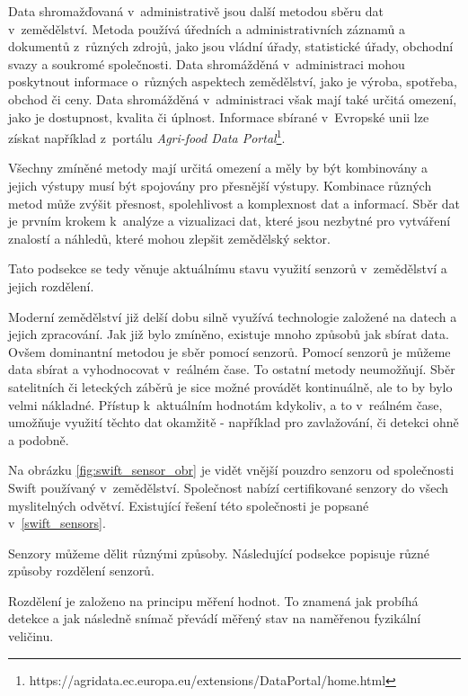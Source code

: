 Data shromažďovaná v~administrativě jsou další metodou sběru dat v~zemědělství. Metoda používá úředních a administrativních záznamů a dokumentů z~různých zdrojů, jako jsou vládní úřady, statistické úřady, obchodní svazy a soukromé společnosti. Data shromážděná v~administraci mohou poskytnout informace o~různých aspektech zemědělství, jako je výroba, spotřeba, obchod či ceny. Data shromážděná v~administraci však mají také určitá omezení, jako je dostupnost, kvalita či úplnost. Informace sbírané v~Evropské unii lze získat například z~portálu \textit{Agri-food Data Portal}\footnote{https://agridata.ec.europa.eu/extensions/DataPortal/home.html}.

Všechny zmíněné metody mají určitá omezení a měly by být kombinovány a jejich výstupy musí být spojovány pro přesnější výstupy. Kombinace různých metod může zvýšit přesnost, spolehlivost a komplexnost dat a informací. Sběr dat je prvním krokem k~analýze a vizualizaci dat, které jsou nezbytné pro vytváření znalostí a náhledů, které mohou zlepšit zemědělský sektor.

Tato podsekce se tedy věnuje aktuálnímu stavu využití senzorů v~zemědělství a jejich rozdělení. 

Moderní zemědělství již delší dobu silně využívá technologie založené na datech a jejich zpracování. Jak již bylo zmíněno, existuje mnoho způsobů jak sbírat data. Ovšem dominantní metodou je sběr pomocí senzorů. Pomocí senzorů je můžeme data sbírat a vyhodnocovat v~reálném čase. To ostatní metody neumožňují. Sběr satelitních či leteckých záběrů je sice možné provádět kontinuálně, ale to by bylo velmi nákladné. Přístup k~aktuálním hodnotám kdykoliv, a to v~reálném čase, umožňuje využití těchto dat okamžitě - například pro zavlažování, či detekci ohně a podobně. 

Na obrázku \ref{fig:swift_sensor_obr} je vidět vnější pouzdro senzoru od společnosti Swift používaný v~zemědělství. Společnost nabízí certifikované senzory do všech myslitelných odvětví. Existující řešení této společnosti je popsané v~\ref{swift_sensors}.



Senzory můžeme dělit různými způsoby. Následující podsekce popisuje různé způsoby rozdělení senzorů. 

Rozdělení je založeno na principu měření hodnot. To znamená jak probíhá detekce a jak následně snímač převádí měřený stav na naměřenou fyzikální veličinu.

